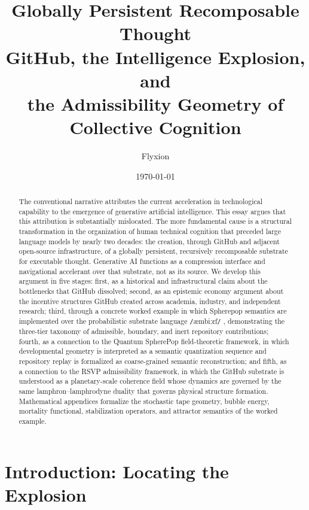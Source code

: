 \documentclass[12pt]{article}
\title{{\large\bfseries Globally Persistent Recomposable Thought}\\[4pt]
{\normalsize GitHub, the Intelligence Explosion, and\\
the Admissibility Geometry of Collective Cognition}}
\author{Flyxion}
\date{\today}
\newcommand{\ambibf}{%
  \texttt{/}\textnormal{æmbiːɛf}\texttt{/}%
}
\begin{document}
\maketitle

\begin{abstract}
The conventional narrative attributes the current acceleration in technological
capability to the emergence of generative artificial intelligence. This essay
argues that this attribution is substantially mislocated. The more fundamental
cause is a structural transformation in the organization of human technical
cognition that preceded large language models by nearly two decades: the
creation, through GitHub and adjacent open-source infrastructure, of a globally
persistent, recursively recomposable substrate for executable thought. Generative
AI functions as a compression interface and navigational accelerant over that
substrate, not as its source. We develop this argument in five stages: first, as
a historical and infrastructural claim about the bottlenecks that GitHub
dissolved; second, as an epistemic economy argument about the incentive
structures GitHub created across academia, industry, and independent research;
third, through a concrete worked example in which Spherepop semantics are
implemented over the probabilistic substrate language \ambibf{},
demonstrating the three-tier taxonomy of admissible, boundary, and inert
repository contributions; fourth, as a connection to the Quantum SpherePop
field-theoretic framework, in which developmental geometry is interpreted as
a semantic quantization sequence and repository replay is formalized as
coarse-grained semantic reconstruction; and fifth, as a connection to the RSVP
admissibility framework, in which the GitHub substrate is understood as a
planetary-scale coherence field whose dynamics are governed by the same
lamphron--lamphrodyne duality that governs physical structure formation.
Mathematical appendices formalize the stochastic tape geometry, bubble energy,
mortality functional, stabilization operators, and attractor semantics of the
worked example.
\end{abstract}

\tableofcontents
\clearpage


\section{Introduction: Locating the Explosion}
\end{document}
